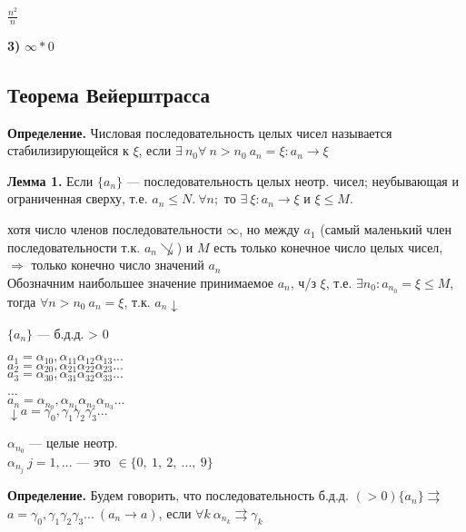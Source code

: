 \documentclass{article}
\begin{document}
    \( \frac{n^2}{n}  \) %

    \textbf{3)} \(\infty * 0\)
    
    \subsection{Теорема Вейерштрасса}

    \textbf{Определение.}
    Числовая последовательность целых чисел называется стабилизирующейся к \(\xi\), если \( \exists\ n_0 \forall\ n > n_0\  a_n = \xi: a_n \rightarrow \xi \)
    
    \textbf{Лемма 1.}
    Если \(\{a_n\}\) --- последовательность целых неотр. чисел; неубывающая и ограниченная сверху, т.е. \( a_n \leq N.\ \forall n;\) то \( \exists\ \xi: a_n \rightarrow \xi \) и \( \xi \leq M \).

    хотя число членов последовательности \(\infty\), но между \(a_1\) (самый маленький член последовательности т.к. \( a_n \not\searrow \)) и \(M\) есть только конечное число целых чисел, \(\Rightarrow\) только конечно число значений \(a_n\)\\
    Обозначним наибольшее значение принимаемое \( a_n \), ч/з \( \xi \), т.е. \( \exists n_0: a_{n_0} = \xi \leq M \), тогда \( \forall n > n_0\ a_n = \xi \), т.к. \( a_n \downarrow \)
    
    \(\{a_n\}\) --- б.д.д. > 0
    
    \(a_1 = \alpha_{10},\alpha_{11}\alpha_{12}\alpha_{13}...\)\\
    \(a_2 = \alpha_{20},\alpha_{21}\alpha_{22}\alpha_{23}...\)\\
    \(a_3 = \alpha_{30},\alpha_{31}\alpha_{32}\alpha_{33}...\)\\
    ...\\
    \(a_n = \alpha_{n_0},\alpha_{n_1}\alpha_{n_2}\alpha_{n_3}...\)\\
    \(\downarrow a = \gamma_0,\gamma_1\gamma_2\gamma_3...\)

    \(\alpha_{n_0}\) --- целые неотр.\\
    \(\alpha_{n_j}\  j = 1, ...\) --- это \(\in \{0,\ 1,\ 2, \ ..., \ 9\}\)

    \textbf{Определение.} Будем говорить, что последовательность б.д.д. \( (>0) \{a_n\} \rightrightarrows \)\\
    \( a = \gamma_0,\gamma_1\gamma_2\gamma_3...\ (a_n \rightarrow a) \), если \(\forall k \ \alpha_{n_k} \rightrightarrows \gamma_k\)
\end{document}
